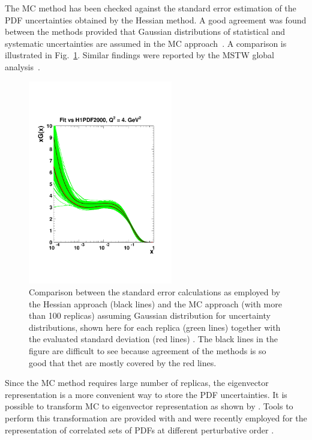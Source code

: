 \begin{description}
The MC method has been checked against the standard error estimation of the PDF uncertainties obtained by the Hessian method. 
A good agreement was found between the methods provided that Gaussian distributions of statistical and systematic uncertainties are assumed in the MC 
approach~\cite{hera-lhc:report2009}.
A comparison is illustrated in Fig.~\ref{fig:mchessian}. 
Similar findings were reported by the MSTW global analysis~\cite{Watt:2012tq}. 
\begin{figure}[!ht]
 \centering
  \includegraphics[trim=1cm 4cm 1cm 5cm, clip, width=6.3cm]{mchessian.pdf}
  \caption{Comparison between the standard error calculations as employed by the Hessian approach (black lines) 
           and the MC approach (with more than 100 replicas) assuming Gaussian distribution for uncertainty 
           distributions, shown here for each replica 
          (green lines) together with the evaluated standard deviation (red lines) \cite{hera-lhc:report2009}.
          The black lines in the figure are difficult to see because agreement of the methods is so good that thet are mostly covered by the red lines.}
  \label{fig:mchessian}        
\end{figure}
%

Since the MC method requires large number of replicas, the eigenvector representation 
is a more convenient way to store the PDF uncertainties.
It is possible to transform MC to eigenvector
representation as shown by \cite{Gao:2013bia}. Tools to perform this transformation are provided with \fitter and were 
recently employed for the representation of correlated sets of PDFs at different perturbative order \cite{hfcorrpaper}.
%
\end{description}
